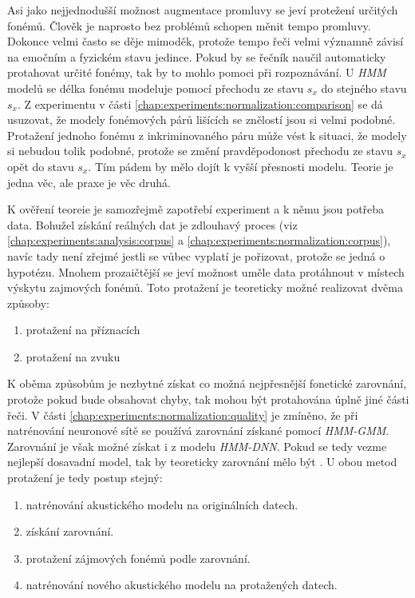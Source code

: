 Asi jako nejjednodušší možnost augmentace promluvy se jeví protežení určitých fonémů. Člověk je naprosto bez problémů schopen měnit tempo promluvy. Dokonce velmi často se děje mimoděk, protože tempo řeči velmi významně závisí na emočním a fyzickém stavu jedince. Pokud by se řečník naučil automaticky protahovat určité fonémy, tak by to mohlo pomoci při rozpoznávání. U \textit{HMM} modelů se délka fonému modeluje pomocí přechodu ze stavu $s_x$ do stejného stavu $s_x$. Z  experimentu v části \ref{chap:experiments:normalization:comparison} se dá usuzovat, že modely fonémových párů lišících se znělostí jsou si velmi podobné. Protažení jednoho fonému z inkriminovaného páru může vést k situaci, že modely si nebudou tolik podobné, protože se změní pravděpodonost přechodu ze stavu $s_x$ opět do stavu $s_x$. Tím pádem by mělo dojít k vyšší přesnosti modelu. Teorie je jedna věc, ale praxe je věc druhá.

K ověření teoreie je samozřejmě zapotřebí experiment a k němu jsou potřeba data. Bohužel získání reálných dat je zdlouhavý proces (viz \ref{chap:experiments:analysis:corpus} a \ref{chap:experiments:normalization:corpus}), navíc tady není zřejmé jestli se vůbec vyplatí je pořizovat, protože se jedná o hypotézu. Mnohem prozaičtější se jeví možnost uměle data protáhnout v místech výskytu zajmových fonémů. Toto protažení je teoreticky možné realizovat dvěma způsoby:

\begin{enumerate}
  \item protažení na příznacích
  \item protažení na zvuku
\end{enumerate}

\noindent K oběma způsobům je nezbytné získat co možná nejpřesnější fonetické zarovnání, protože pokud bude obsahovat chyby, tak mohou být protahována úplně jiné části řeči. V části \ref{chap:experiments:normalization:quality} je zmíněno, že při natrénování neuronové sítě se používá zarovnání získané pomocí \textit{HMM-GMM}. Zarovnání je však možné získat i z modelu \textit{HMM-DNN}. Pokud se tedy vezme nejlepší dosavadní model, tak by teoreticky zarovnání mělo být . U obou metod protažení je tedy postup stejný:

\begin{enumerate}
  \item natrénování akustického modelu na originálních datech.
  \item získání zarovnání.
  \item protažení zájmových fonémů podle zarovnání.
  \item natrénování nového akustického modelu na protažených datech.
\end{enumerate}

